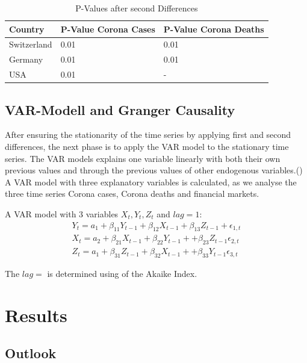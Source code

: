 \documentclass[11pt]{article}
\begin{document}
\begin{table}[h!]
\centering
\caption{P-Values after second Differences}
\label{tab:p-values-second-diff}
\begin{tabular}{|l|l|l|}
\hline
\textbf{Country} &\textbf{P-Value Corona Cases} & \textbf{P-Value Corona Deaths}  \\ \hline
Switzerland      & 0.01 & 0.01         \\ \hline
Germany          & 0.01 & 0.01             \\ \hline
USA              & 0.01 & -            \\ \hline
\end{tabular}
\end{table}

\subsection{VAR-Modell and Granger Causality}
After ensuring the stationarity of the time series by applying first and second differences, the next phase is to apply the VAR model to the stationary time series. The VAR models explains one variable linearly with both their own previous values and through the previous values of other endogenous variables.(\cite{PowerPoi49:online}) A VAR model with three explanatory variables is calculated, as we analyse the three time series Corona cases, Corona deaths and financial markets.

A VAR model with 3 variables $X_{t},Y_{t}, Z_{t}$ and $lag = 1$:
$$
\begin{array}{l}
Y_{t}=a_{1}+\beta_{11} Y_{t-1}+\beta_{12} X_{t-1}+\beta_{13} Z_{t-1}+\epsilon_{1, t} \\
X_{t}=a_{2}+\beta_{21} X_{t-1}+\beta_{22} Y_{t-1}++\beta_{23} Z_{t-1}\epsilon_{2, t}\\
Z_{t}=a_{1}+\beta_{31} Z_{t-1}+\beta_{32} X_{t-1}++\beta_{33} Y_{t-1}\epsilon_{3, t}
\end{array}
$$

The $ lag = $ is determined using of the Akaike Index.
\section{Results}
\subsection{Outlook}
\end{document}

